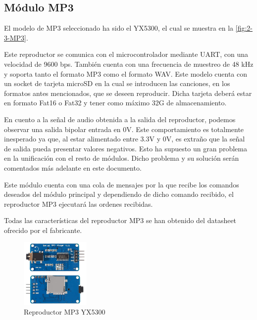 \subsection{Módulo MP3}
El modelo de MP3 seleccionado ha sido el YX5300, el cual se muestra en la \autoref{fig:2-3-MP3}.

Este reproductor se comunica con el microcontrolador mediante UART, con una velocidad de 9600 bps. También cuenta con una frecuencia de muestreo de 48 kHz y soporta tanto el formato MP3 como el formato WAV. Este modelo cuenta con un socket de tarjeta microSD en la cual se introducen las canciones, en los formatos antes mencionados, que se deseen reproducir. Dicha tarjeta deberá estar en formato Fat16 o Fat32 y tener como máximo 32G de almacenamiento.

En cuento a la señal de audio obtenida a la salida del reproductor, podemos observar una salida bipolar entrada en 0V. Este comportamiento es totalmente inesperado ya que, al estar alimentado entre 3.3V y 0V, es extraño que la señal de salida pueda presentar valores negativos. Esto ha supuesto un gran problema en la unificación con el resto de módulos. Dicho problema y su solución serán comentados más adelante en este documento.

Este módulo cuenta con una cola de mensajes por la que recibe los comandos deseados del módulo principal y dependiendo de dicho comando recibido, el reproductor MP3 ejecutará las ordenes recibidas.

Todas las características del reproductor MP3 se han obtenido del datasheet ofrecido por el fabricante.

\begin{figure}[h]
    \centering
    \includegraphics[width=0.3\textwidth]{images/2/2-4/MP3.jpg}
    \caption{Reproductor MP3 YX5300}
    \label{fig:2-3-MP3}
\end{figure}